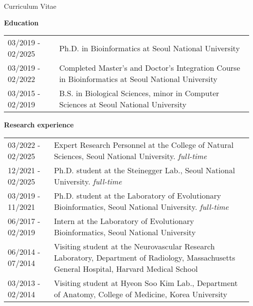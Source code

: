 \documentclass{resume} %
\begin{document}


\setcounter{tocdepth}{1}

\pagestyle{plain}
\setcounter{page}{1}

\setlength{\oddsidemargin}{-0.2cm}
\setlength{\evensidemargin}{-0.2cm}
\setlength{\linewidth}{16.5cm}
\setlength{\textheight}{26cm}
\setlength{\tabcolsep}{0cm}


\begin{rSection}{Curriculum Vitae}
\vspace{2mm}

{\bf Education}\vspace{1mm}

\begin{tabular}{p{3.6cm}p{13.0cm}}
03/2019 - 02/2025 & Ph.D. in Bioinformatics at Seoul National University
\\[1.mm]
03/2019 - 02/2022 & Completed Master's and Doctor's Integration Course in Bioinformatics at Seoul National University
\\[1.mm]
03/2015 - 02/2019 & B.S. in Biological Sciences, minor in Computer Sciences at Seoul National University 
\\[1mm]
\end{tabular}
\vspace{1mm}

{\bf Research experience}\vspace{1mm}

\begin{tabular}{p{3.6cm}p{13.0cm}}
03/2022 - 02/2025 & Expert Research Personnel at the College of Natural Sciences, Seoul National University. \textit{full-time}
\\[1.mm]
12/2021 - 02/2025 & Ph.D. student at the Steinegger Lab., Seoul National University. \textit{full-time}
\\[1.mm]
03/2019 - 11/2021 & Ph.D. student at the Laboratory of Evolutionary Bioinformatics, Seoul National University. \textit{full-time}
\\[1.mm]
06/2017 - 02/2019 & Intern at the Laboratory of Evolutionary Bioinformatics, Seoul National University
\\[1.mm]
06/2014 - 07/2014 & Visiting student at the Neurovascular Research Laboratory, Department of Radiology, Massachusetts General Hospital, Harvard Medical School
\\[1.mm]
03/2013 - 02/2014 & Visiting student at Hyeon Soo Kim Lab., Department of Anatomy, College of Medicine, Korea University
\\[1.mm]
\end{tabular}
\vspace{1mm}
\end{rSection}
\end{document}
